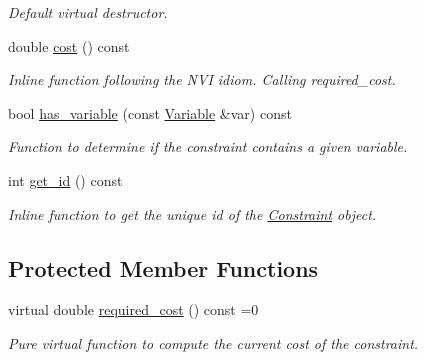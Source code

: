 \begin{DoxyCompactItemize}
\begin{DoxyCompactList}\small\item\em Default virtual destructor. \end{DoxyCompactList}\item 
double \hyperlink{classghost_1_1Constraint_adfa4826bcaea9e4a692fb0c4630ca214}{cost} () const 
\begin{DoxyCompactList}\small\item\em Inline function following the N\+VI idiom. Calling required\+\_\+cost. \end{DoxyCompactList}\item 
bool \hyperlink{classghost_1_1Constraint_a38945fa5e732b91d51c0eedfec9a99e3}{has\+\_\+variable} (const \hyperlink{classghost_1_1Variable}{Variable} \&var) const 
\begin{DoxyCompactList}\small\item\em Function to determine if the constraint contains a given variable. \end{DoxyCompactList}\item 
int \hyperlink{classghost_1_1Constraint_af483429a319284503ff634105cadbe08}{get\+\_\+id} () const 
\begin{DoxyCompactList}\small\item\em Inline function to get the unique id of the \hyperlink{classghost_1_1Constraint}{Constraint} object. \end{DoxyCompactList}\end{DoxyCompactItemize}
\subsection*{Protected Member Functions}
\begin{DoxyCompactItemize}
\item 
virtual double \hyperlink{classghost_1_1Constraint_a6ef4cd03a4dc864a8d308e55044c615d}{required\+\_\+cost} () const =0
\begin{DoxyCompactList}\small\item\em Pure virtual function to compute the current cost of the constraint. \end{DoxyCompactList}\end{DoxyCompactItemize}
